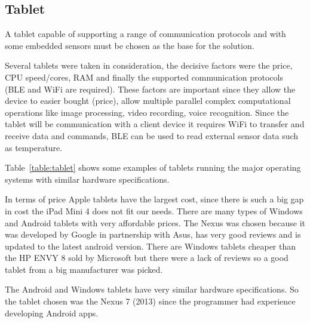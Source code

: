 \subsection{Tablet}

A tablet capable of supporting a range of communication protocols and with some embedded sensors must be chosen as the base for the solution.

Several tablets were taken in consideration, the decisive factors were the price, \ac{CPU} speed/cores, \ac{RAM} and finally the supported communication protocols (\ac{BLE} and \ac{WiFi} are required). These factors are important since they allow the device to easier bought (price), allow multiple parallel complex computational operations like image processing, video recording, voice recognition. Since the tablet will be communication with a client device it requires \ac{WiFi} to transfer and receive data and commands, \ac{BLE} can be used to read external sensor data such as temperature.


Table~\ref{table:tablet} shows some examples of tablets running the major operating systems with similar hardware specifications.

In terms of price Apple tablets have the largest cost, since there is such a big gap in cost the iPad Mini 4 does not fit our needs. There are many types of Windows and Android tablets with very affordable prices. The Nexus was chosen because it was developed by Google in partnership with Asus, has very good reviews and is updated to the latest android version. There are Windows tablets cheaper than the HP ENVY 8 sold by Microsoft but there were a lack of reviews so a good tablet from a big manufacturer was picked.

The Android and Windows tablets have very similar hardware specifications. So the tablet chosen was the Nexus 7 (2013) since the programmer had experience developing Android apps.


